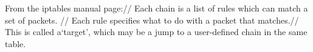 From the iptables manual page://
Each  chain  is a list of rules which can match a set of packets. //
Each rule specifies what to do with a packet that matches.//
This is called a`target',  which  may be a jump to a user-defined chain in the same table.
